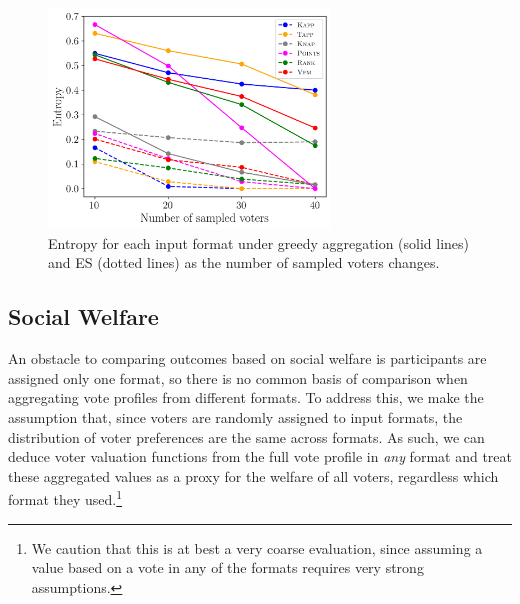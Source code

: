 \documentclass{comsoc2023}
\newcommand{\mes}{ES}
\begin{document}

\begin{figure}[!h]
\begin{center}
\includegraphics[width=7.5cm]{experiment/entropy_small_a.png}
\caption{Entropy for each input format under  greedy aggregation  (solid lines) and \mes{} (dotted lines)  as the number of sampled voters changes. }\label{fig:entropy}
\end{center}
\vspace{-3mm}
\end{figure}

\subsection{Social Welfare}
An obstacle to comparing outcomes based on social welfare is participants are assigned only one format, so there is no common basis of comparison when aggregating vote profiles from different formats. To address this, we make the assumption that, since voters are randomly assigned to input formats, the distribution of voter preferences are the same across formats. As such, we can deduce voter valuation functions from the full vote profile in \emph{any} format and treat these aggregated values as a proxy for the welfare of all voters, regardless which format they used.\footnote{ We caution that this is at best a very coarse evaluation, since assuming a value based on  a vote in any of the formats requires very strong assumptions. %
} %
\end{document}
